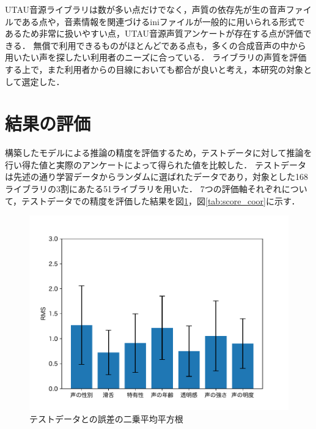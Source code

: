 UTAU音源ライブラリは数が多い点だけでなく，声質の依存先が生の音声ファイルである点や，音素情報を関連づけるiniファイルが一般的に用いられる形式であるため非常に扱いやすい点，UTAU音源声質アンケートが存在する点が評価できる．
無償で利用できるものがほとんどである点も，多くの合成音声の中から用いたい声を探したい利用者のニーズに合っている．
ライブラリの声質を評価する上で，また利用者からの目線においても都合が良いと考え，本研究の対象として選定した．

\section{結果の評価} \label{sec:eval}
構築したモデルによる推論の精度を評価するため，テストデータに対して推論を行い得た値と実際のアンケートによって得られた値を比較した．
テストデータは先述の通り学習データからランダムに選ばれたデータであり，対象とした168ライブラリの3割にあたる51ライブラリを用いた．
7つの評価軸それぞれについて，テストデータでの精度を評価した結果を図\ref{tab:score_box}，図\ref{tab:score_coor}に示す．

\begin{figure}[h]
  \centering
  \includegraphics[width=\linewidth]{fig/model_quality_rms.pdf}
  \caption{テストデータとの誤差の二乗平均平方根}
  \label{tab:score_box}
\end{figure}

